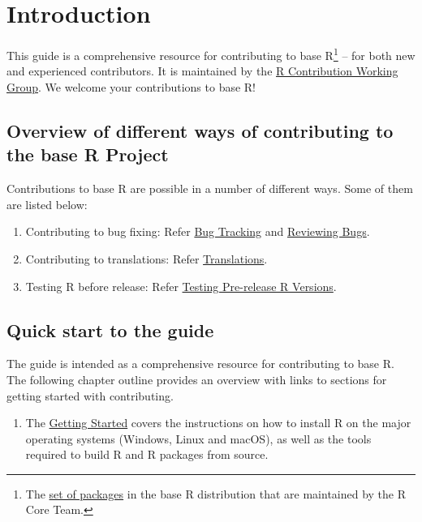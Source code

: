 \documentclass[
]{book}
\providecommand{\tightlist}{%
  \setlength{\itemsep}{0pt}\setlength{\parskip}{0pt}}
\begin{document}
\hypertarget{introduction}{%
\chapter{Introduction}\label{introduction}}

This guide is a comprehensive resource for contributing to base R\footnote{The \href{https://cran.r-project.org/doc/FAQ/R-FAQ.html\#Add_002don-packages-in-R}{set of packages} in the base R distribution that are maintained by the R Core Team.} -- for both new and experienced contributors. It is maintained by the \href{/working-group}{R Contribution Working Group}. We welcome your contributions to base R!

\hypertarget{overview-of-different-ways-of-contributing-to-the-base-r-project}{%
\section{Overview of different ways of contributing to the base R Project}\label{overview-of-different-ways-of-contributing-to-the-base-r-project}}

Contributions to base R are possible in a number of different ways. Some of them are listed below:

\begin{enumerate}
\def\labelenumi{\arabic{enumi}.}
\tightlist
\item
  Contributing to bug fixing: Refer \protect\hyperlink{BugTrack}{Bug Tracking} and \protect\hyperlink{ReviewBugs}{Reviewing Bugs}.
\item
  Contributing to translations: Refer \protect\hyperlink{}{Translations}.
\item
  Testing R before release: Refer \protect\hyperlink{TestRVer}{Testing Pre-release R Versions}.
\end{enumerate}

\hypertarget{quick-start-to-the-guide}{%
\section{Quick start to the guide}\label{quick-start-to-the-guide}}

The guide is intended as a comprehensive resource for contributing to base R. The following chapter outline provides an overview with links to sections for getting started with contributing.

\begin{enumerate}
\def\labelenumi{\arabic{enumi}.}
\tightlist
\item
  The \protect\hyperlink{GetStart}{Getting Started} covers the instructions on how to install R on the major operating systems (Windows, Linux and macOS), as well as the tools required to build R and R packages from source.
\end{enumerate}
\end{document}
